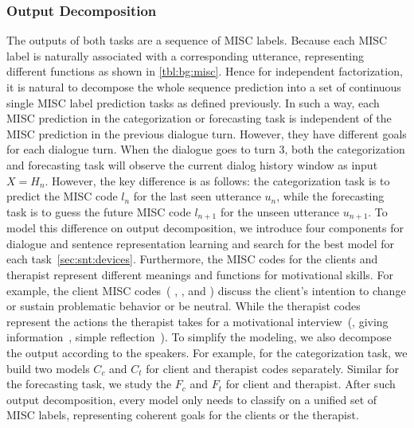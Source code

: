 \subsubsection{Output Decomposition}
\label{sssec:snt:output-decomposition}
The outputs of both tasks are a sequence of MISC labels. Because each
MISC label is naturally associated with a corresponding utterance,
representing different functions as shown in
\autoref{tbl:bg:misc}. Hence for independent factorization, it is
natural to decompose the whole sequence prediction into a set of
continuous single MISC label prediction tasks as defined
previously. In such a way, each MISC prediction in the categorization
or forecasting task is independent of the MISC prediction in the
previous dialogue turn. However, they have different goals for each
dialogue turn. When the dialogue goes to turn 3, both the
categorization and forecasting task will observe the current dialog
history window as input $X=H_{n}$. However, the key difference is as
follows: the categorization task is to predict the MISC code $l_{n}$
for the last seen utterance $u_{n}$, while the forecasting task is to
guess the future MISC code $l_{n+1}$ for the unseen utterance
$u_{n+1}$. To model this difference on output decomposition, we
introduce four components for dialogue and sentence representation
learning and search for the best model for each
task~\autoref{sec:snt:devices}. Furthermore, the MISC codes for the
clients and therapist represent different meanings and functions for
motivational skills. For example, the client MISC codes~( \SUSTAIN,
\CHANGE, and \FN) discuss the client's intention to change or sustain
problematic behavior or be neutral. While the therapist codes
represent the actions the therapist takes for a motivational
interview~(\eg, giving information~\GI, simple reflection~\RES). To
simplify the modeling, we also decompose the output according to the
speakers. For example, for the categorization task, we build two
models $C_{c}$ and $C_{t}$ for client and therapist codes
separately. Similar for the forecasting task, we study the $F_{c}$ and
$F_{t}$ for client and therapist. After such output decomposition,
every model only needs to classify on a unified set of MISC labels,
representing coherent goals for the clients or the therapist.

